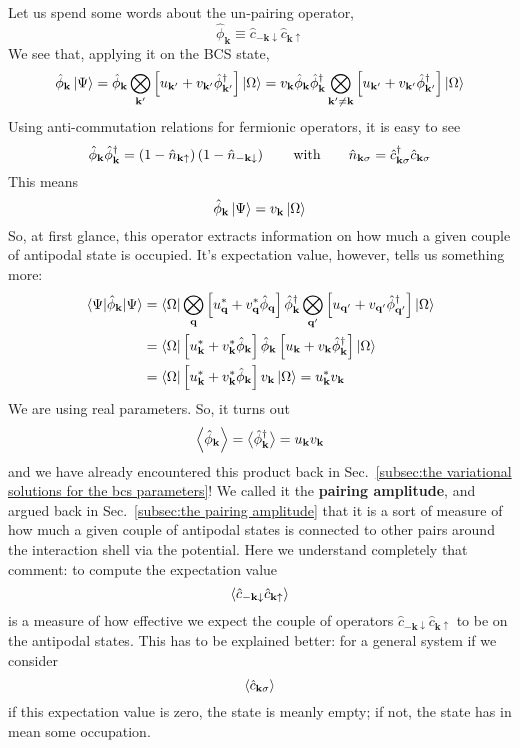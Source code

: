 Let us spend some words about the un-pairing operator,
\[
	\hat{\phi}_\mathbf{k} \equiv  \hat{c}_{-\mathbf{k}\downarrow} \hat{c}_{\mathbf{k}\uparrow}
\]
We see that, applying it on the BCS state,
\[
	\hat{\phi}_\mathbf{k} \ket{\Psi} = \hat{\phi}_\mathbf{k} \bigotimes_{\mathbf{k}'} \left[{u_{\mathbf{k}'} + v_{\mathbf{k}'} \hat{\phi}_{\mathbf{k}'}^\dagger}\right] \ket{\Omega} = v_\mathbf{k} \hat{\phi}_\mathbf{k} \hat{\phi}_\mathbf{k}^\dagger \bigotimes_{\mathbf{k}' \neq \mathbf{k}} \left[{u_{\mathbf{k}'} + v_{\mathbf{k}'} \hat{\phi}_{\mathbf{k}'}^\dagger}\right] \ket{\Omega}
\]
Using anti-commutation relations for fermionic operators, it is easy to see
\[
	\hat{\phi}_\mathbf{k} \hat{\phi}_\mathbf{k}^\dagger = \lrR{1 - \hat{n}_{\mathbf{k}\uparrow}} \lrR{1 - \hat{n}_{-\mathbf{k}\downarrow}}
	\quad\qq{with}\quad
	\hat{n}_{\mathbf{k}\sigma} = \hat{c}_{\mathbf{k}\sigma}^\dagger \hat{c}_{\mathbf{k}\sigma}
\]
This means
\[
	\hat{\phi}_\mathbf{k} \ket{\Psi} = v_\mathbf{k} \ket{\Omega}
\]
So, at first glance, this operator extracts information on how much a given couple of antipodal state is occupied. It's expectation value, however, tells us something more:
\[
\begin{aligned}
	\mel{\Psi}{\hat{\phi}_\mathbf{k}}{\Psi} &= \bra{\Omega} \bigotimes_\mathbf{q} \lrS{u_\mathbf{q}^* + v_\mathbf{q}^* \hat{\phi}_\mathbf{q}} \hat{\phi}_\mathbf{k}^\dagger \bigotimes_{\mathbf{q}'} \lrS{u_{\mathbf{q}'} + v_{\mathbf{q}'} \hat{\phi}_{\mathbf{q}'}^\dagger} \ket{\Omega} \\
	&= \bra{\Omega} \lrS{\vphantom{\hat{\phi}_\mathbf{k}^\dagger} u_\mathbf{k}^* + v_\mathbf{k}^* \hat{\phi}_\mathbf{k}} \hat{\phi}_\mathbf{k} \lrS{u_\mathbf{k} + v_\mathbf{k} \hat{\phi}_\mathbf{k}^\dagger} \ket{\Omega} \\
	&= \bra{\Omega} \lrS{\vphantom{\hat{\phi}_\mathbf{k}^\dagger} u_\mathbf{k}^* + v_\mathbf{k}^* \hat{\phi}_\mathbf{k}} v_\mathbf{k} \ket{\Omega}
	=  u_\mathbf{k}^* v_\mathbf{k}
\end{aligned}
\]
We are using real parameters. So, it turns out
\[
	\ev{\hat{\phi}_\mathbf{k}} = \big\langle\hat{\phi}_\mathbf{k}^\dagger\big\rangle = u_\mathbf{k} v_\mathbf{k}
\]
and we have already encountered this product back in Sec.~\ref{subsec:the variational solutions for the bcs parameters}! We called it the \textbf{pairing amplitude}, and argued back in Sec.~\ref{subsec:the pairing amplitude} that it is a sort of measure of how much a given couple of antipodal states is connected to other pairs around the interaction shell via the potential. {\color{red}Here we understand completely that comment: to compute the expectation value
\[
	\ev{\hat{c}_{-\mathbf{k}\downarrow} \hat{c}_{\mathbf{k}\uparrow}}
\]
is a measure of how effective we expect the couple of operators $\hat{c}_{-\mathbf{k}\downarrow} \hat{c}_{\mathbf{k}\uparrow}$ to be on the antipodal states. This has to be explained better: for a general system if we consider
\[
	\ev{\hat{c}_{\mathbf{k}\sigma}}
\]
if this expectation value is zero, the state is meanly empty; if not, the state has in mean some occupation.}



